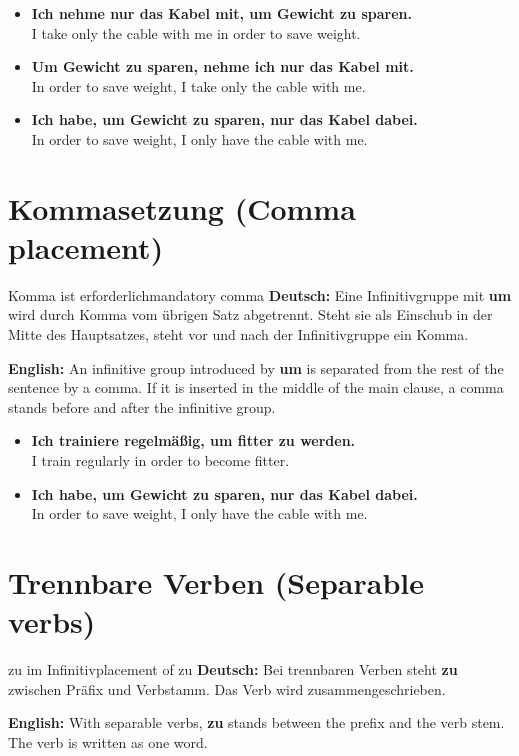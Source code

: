 \documentclass[a4paper,11pt]{article}
\newcommand{\GermanText}[1]{\textbf{Deutsch: }#1\par}
\newcommand{\EnglishText}[1]{{\small\color{SoftGray}\textbf{English: }#1\par}}
\newcommand{\ExampleItem}[2]{\item \textbf{#1}\\{\small\color{SoftGray}#2}}
\begin{document}
        \begin{exbox}
            \begin{itemize}
                \ExampleItem{Ich nehme nur das Kabel mit, um Gewicht zu sparen.}{I take only the cable with me in order to save weight.}
                \ExampleItem{Um Gewicht zu sparen, nehme ich nur das Kabel mit.}{In order to save weight, I take only the cable with me.}
                \ExampleItem{Ich habe, um Gewicht zu sparen, nur das Kabel dabei.}{In order to save weight, I only have the cable with me.}
            \end{itemize}
        \end{exbox}


    \section{Kommasetzung \textnormal{(Comma placement)}}

        \begin{grammarentry}{Komma ist erforderlich}{mandatory comma}
            \GermanText{Eine Infinitivgruppe mit \textbf{um} wird durch Komma vom übrigen Satz abgetrennt. Steht sie als Einschub in der Mitte des Hauptsatzes, steht vor und nach der Infinitivgruppe ein Komma.}
            \EnglishText{An infinitive group introduced by \textbf{um} is separated from the rest of the sentence by a comma. If it is inserted in the middle of the main clause, a comma stands before and after the infinitive group.}
        \end{grammarentry}

        \begin{exbox}
            \begin{itemize}
                \ExampleItem{Ich trainiere regelmäßig, um fitter zu werden.}{I train regularly in order to become fitter.}
                \ExampleItem{Ich habe, um Gewicht zu sparen, nur das Kabel dabei.}{In order to save weight, I only have the cable with me.}
            \end{itemize}
        \end{exbox}


    \section{Trennbare Verben \textnormal{(Separable verbs)}}

        \begin{grammarentry}{zu im Infinitiv}{placement of zu}
            \GermanText{Bei trennbaren Verben steht \textbf{zu} zwischen Präfix und Verbstamm. Das Verb wird zusammengeschrieben.}
            \EnglishText{With separable verbs, \textbf{zu} stands between the prefix and the verb stem. The verb is written as one word.}
        \end{grammarentry}
\end{document}

